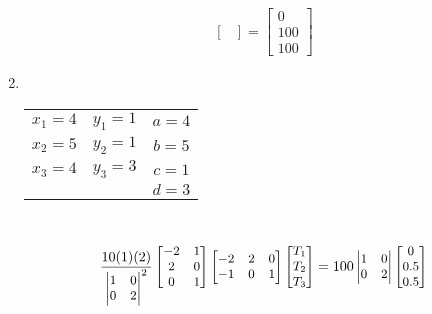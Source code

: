 \documentclass[10pt]{article}
\begin{document}
\begin{enumerate}
\begin{align*}
{\begin{bmatrix}
\end{bmatrix} =  
\begin{bmatrix} 
0 \\ 100 \\ 100
\end{bmatrix}}
\end{align*}
\newpage
\item\mbox{}\\
\begin{minipage}{0.5\textwidth}
\end{minipage}
\begin{minipage}{0.5\textwidth}
\begin{tabular}{ccc}
$x_1 = 4$ & $y_1 = 1$ & $a = 4 $\\
$x_2 = 5 $& $y_2 = 1$ & $b = 5 $\\
$x_3 = 4$ & $y_3 = 3$ & $c = 1 $ \\
 & & $d = 3$
\end{tabular}
\end{minipage} \\
\begin{align*}
\small{
\frac{10(1)(2)}
{\begin{vmatrix}
1 & 0 \\
0 & 2
\end{vmatrix}^2} 
\begin{bmatrix}
-2 & 1\\
 2 & 0 \\
 0 & 1
\end{bmatrix} 
\begin{bmatrix}
-2 & 2 & 0 \\
-1 & 0 & 1
\end{bmatrix} 
\begin{bmatrix}
T_1 \\ T_2 \\ T_3
\end{bmatrix} = 100 
\begin{vmatrix} 1 & 0 \\ 
0 & 2 \end{vmatrix} 
\begin{bmatrix} 
0 \\ 0.5 \\ 0.5
\end{bmatrix}}

\end{align*}
\end{enumerate}
\end{document}
